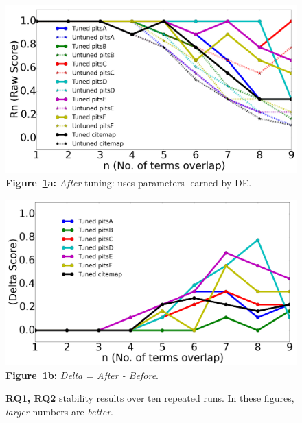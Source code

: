 \documentclass[10pt,conference]{IEEEtran}
\theoremstyle{break}
\begin{document}
\begin{figure}[!htbp]
    \centering
    \begin{minipage}{.51\textwidth}
        \begin{center}
        \includegraphics[width=\linewidth]{./fig/raw_graph.png}
  {\bf Figure~\ref{fig:delta}a:}  {\em After} tuning: uses parameters learned by DE.
  \end{center}
    \end{minipage}%
    \begin{minipage}{.5\textwidth}
        \begin{center}
        \includegraphics[width=\linewidth]{./fig/tuned_delta_vem.png}
  {\bf Figure~\ref{fig:delta}b:}  {\em Delta = After - Before}.
  \end{center}
    \end{minipage}
    \caption{{\bf RQ1, RQ2} stability results over ten repeated runs. In these figures, {\em larger} numbers
    are {\em better}.}\label{fig:delta}
\end{figure}
\end{document}
